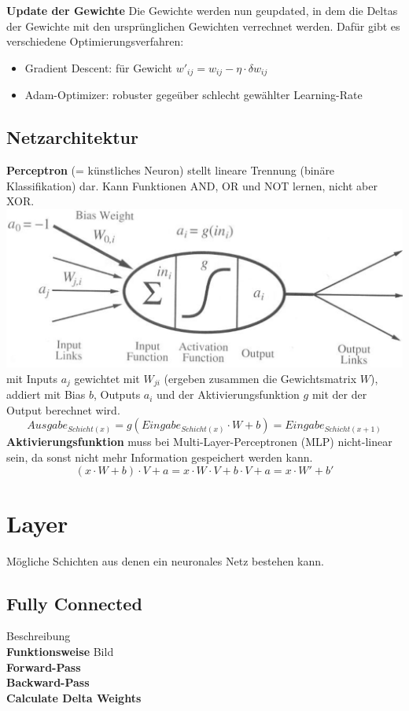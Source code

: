\documentclass[12pt]{article}
\begin{document}
	\textbf{Update der Gewichte} Die Gewichte werden nun geupdated, in dem die Deltas der Gewichte mit den ursprünglichen Gewichten verrechnet werden. Dafür gibt es verschiedene Optimierungsverfahren:
	\begin{itemize}
		\item Gradient Descent: für Gewicht $w'_{ij} = w_{ij} - \eta \cdot \delta w_{ij}$
		\item Adam-Optimizer: robuster gegeüber schlecht gewählter Learning-Rate
	\end{itemize}

	\subsection{Netzarchitektur}
	\textbf{Perceptron} (= künstliches Neuron) stellt lineare Trennung (binäre Klassifikation) dar. Kann Funktionen AND, OR und NOT lernen, nicht aber XOR.\\
	\includegraphics[width=\linewidth]{figures/perceptron.png}\\
	mit Inputs $a_j$ gewichtet mit $W_{ji}$ (ergeben zusammen die Gewichtsmatrix $W$), addiert mit Bias $b$, Outputs $a_i$ und der Aktivierungsfunktion $g$ mit der der Output berechnet wird.
	$$Ausgabe_{Schicht(x)} = g(Eingabe_{Schicht(x)} \cdot W + b) = Eingabe_{Schicht(x+1)}$$
	\textbf{Aktivierungsfunktion} muss bei Multi-Layer-Perceptronen (MLP) nicht-linear sein, da sonst nicht mehr Information gespeichert werden kann.
	$$(x \cdot W + b) \cdot V + a = x \cdot W \cdot V + b \cdot V + a = x \cdot W' + b'$$

	\section{Layer}
	Mögliche Schichten aus denen ein neuronales Netz bestehen kann.
	\subsection{Fully Connected}
	Beschreibung\\
	\textbf{Funktionsweise} Bild\\
	\textbf{Forward-Pass}\\
	\textbf{Backward-Pass}\\
	\textbf{Calculate Delta Weights}
\end{document}
